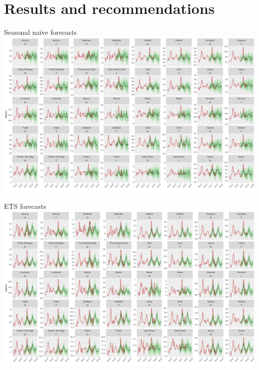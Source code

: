 \documentclass[12pt,aspectratio=169]{beamer}
\begin{document}
\section{Results and recommendations}

\begin{frame}{Seasonal naïve forecasts}
    \centering%
    \includegraphics[height=0.9\textheight]{figures/forecasts_snaive}
\end{frame}

\begin{frame}{ETS forecasts}
    \centering%
    \includegraphics[height=0.9\textheight]{figures/forecasts_ets}
\end{frame}
\end{document}
